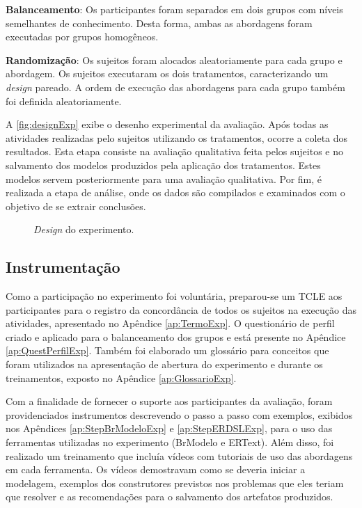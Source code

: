 \textbf{Balanceamento}: Os participantes foram separados em dois grupos com níveis semelhantes de conhecimento. 
Desta forma, ambas as abordagens foram executadas por grupos homogêneos.

\textbf{Randomização}: Os sujeitos foram alocados aleatoriamente para cada grupo e abordagem. 
Os sujeitos executaram os dois tratamentos, caracterizando um \textit{design} pareado. 
A ordem de execução das abordagens para cada grupo também foi definida aleatoriamente.

A \autoref{fig:designExp} exibe o desenho experimental da avaliação. 
Após todas as atividades realizadas pelo sujeitos utilizando os tratamentos, ocorre a coleta dos resultados.
Esta etapa consiste na avaliação qualitativa feita pelos sujeitos e no salvamento dos modelos produzidos pela aplicação dos tratamentos. 
Estes modelos servem posteriormente para uma avaliação qualitativa.
Por fim, é realizada a etapa de análise, onde os dados são compilados e examinados com o objetivo de se extrair conclusões.

\begin{figure}[!htb]
    \centering
    \caption{\textit{Design} do experimento.}
    \label{fig:designExp}
    
\end{figure}



\subsection{Instrumentação} \label{ssec:instExp}

Como a participação no experimento foi voluntária, preparou-se um \ac{TCLE} aos participantes para o registro da concordância de todos os sujeitos na execução das atividades, apresentado no Apêndice \ref{ap:TermoExp}.
O questionário de perfil criado e aplicado para o balanceamento dos grupos e está presente no Apêndice \ref{ap:QuestPerfilExp}.
Também foi elaborado um glossário para conceitos que foram utilizados na apresentação de abertura do experimento e durante os treinamentos, exposto no Apêndice \ref{ap:GlossarioExp}.

Com a finalidade de fornecer o suporte aos participantes da avaliação, foram providenciados instrumentos descrevendo o passo a passo com exemplos, exibidos nos Apêndices \ref{ap:StepBrModeloExp} e \ref{ap:StepERDSLExp}, para o uso das ferramentas utilizadas no experimento (BrModelo e ERText). 
Além disso, foi realizado um treinamento que incluía vídeos com tutoriais de uso das abordagens em cada ferramenta. 
Os vídeos demostravam como se deveria iniciar a modelagem, exemplos dos construtores previstos nos problemas que eles teriam que resolver e as recomendações para o salvamento dos artefatos produzidos. 

